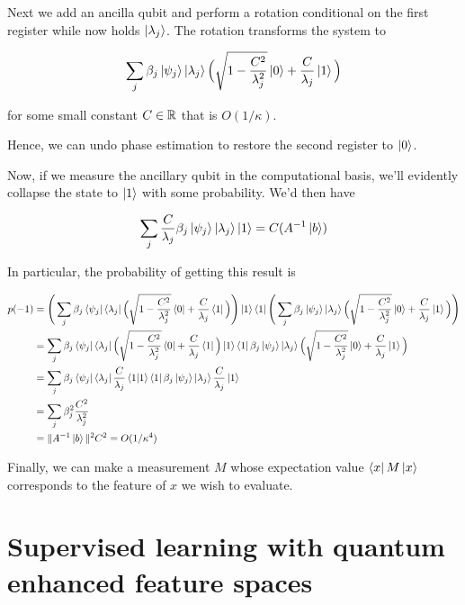 \documentclass[main.tex]{subfiles}
\begin{document}
Next we add an ancilla qubit and perform a rotation conditional on the first register while now holds $\ket{\lambda_j}$. The rotation transforms the system to

\begin{align*}
\sum_j \beta_j \ket{\psi_j} \ket{\lambda_j} \Big(\sqrt{1-\frac{C^2}{\lambda_j^2}}\ket{0} + \frac{C}{\lambda_j}\ket{1}\Big)
\end{align*}

for some small constant $C \in \mathbb{R}$ that is $O(1/\kappa)$.

Hence, we can undo phase estimation to restore the second register to $\ket{0}$.

Now, if we measure the ancillary qubit in the computational basis, we'll evidently collapse the state to $\ket{1}$ with some probability. We'd then have

\begin{align*}
	\sum_j \frac{C}{\lambda_j} \beta_j \ket{\psi_j} \ket{\lambda_j}\ket{1} = C (A^{-1} \ket{b})
\end{align*}

In particular, the probability of getting this result is 

\begin{align*} 
	p(-1) &= \Bigg(\sum_j \beta_j \bra{\psi_j} \bra{\lambda_j} \Big(\sqrt{1-\frac{C^2}{\lambda_j^2}}\bra{0} + \frac{C}{\lambda_j}\bra{1}\Big) \Bigg)\ket{1}\bra{1} \Bigg(\sum_j \beta_j \ket{\psi_j} \ket{\lambda_j} \Big(\sqrt{1-\frac{C^2}{\lambda_j^2}}\ket{0} + \frac{C}{\lambda_j}\ket{1}\Big)\Bigg) \\
	&= \sum_j \beta_j \bra{\psi_j} \bra{\lambda_j} \Big(\sqrt{1-\frac{C^2}{\lambda_j^2}}\bra{0} + \frac{C}{\lambda_j}\bra{1}\Big) \ket{1}\bra{1} \beta_j \ket{\psi_j} \ket{\lambda_j} \Big(\sqrt{1-\frac{C^2}{\lambda_j^2}}\ket{0} + \frac{C}{\lambda_j}\ket{1}\Big) \\
	&= \sum_j \beta_j \bra{\psi_j} \bra{\lambda_j} \frac{C}{\lambda_j}\bra{1}\ket{1}\bra{1} \beta_j \ket{\psi_j} \ket{\lambda_j} \frac{C}{\lambda_j}\ket{1} \\
	&= \sum_j \beta_j^2 \frac{C^2}{\lambda_j^2} \\
	&= \| A^{-1} \ket{b} \|^2 C^2 = O(1/\kappa^4)
\end{align*} 

Finally, we can make a measurement $M$ whose expectation value $\bra{x}M\ket{x}$ corresponds to the feature of $x$ we wish to evaluate. 

\section{Supervised learning with quantum enhanced feature spaces}
\end{document}
